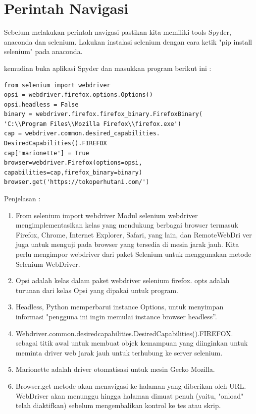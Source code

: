 


\section{Perintah Navigasi}
Sebelum melakukan perintah navigasi pastikan kita memiliki tools Spyder, anaconda dan selenium. Lakukan instalasi selenium dengan cara ketik "pip install selenium" pada anaconda.

kemudian buka aplikasi Spyder dan masukkan program berikut ini :
\begin{verbatim}
from selenium import webdriver
opsi = webdriver.firefox.options.Options()
opsi.headless = False
binary = webdriver.firefox.firefox_binary.FirefoxBinary(
'C:\\Program Files\\Mozilla Firefox\\firefox.exe')
cap = webdriver.common.desired_capabilities.
DesiredCapabilities().FIREFOX
cap['marionette'] = True
browser=webdriver.Firefox(options=opsi,
capabilities=cap,firefox_binary=binary)
browser.get('https://tokoperhutani.com/')
\end{verbatim}

Penjelasan : 
\begin{enumerate}
	\item From selenium import webdriver Modul selenium webdriver mengimplementasikan kelas yang mendukung berbagai browser termasuk Firefox, Chrome, Internet Explorer, Safari, yang lain, dan RemoteWebDri	ver juga untuk menguji pada browser yang tersedia di mesin jarak jauh. Kita perlu mengimpor webdriver dari paket Selenium untuk menggunakan metode Selenium WebDriver.
	\item Opsi adalah kelas dalam paket webdriver selenium firefox. opts adalah turunan dari kelas Opsi yang dipakai untuk program.
	\item Headless, Python memperbarui instance Options, untuk menyimpan informasi "pengguna ini ingin memulai instance browser headless”.
	\item Webdriver.common.desiredcapabilities.DesiredCapabilities().FIREFOX.   sebagai titik awal untuk membuat objek kemampuan yang diinginkan untuk meminta driver web jarak jauh untuk terhubung ke server selenium.  
	\item Marionette adalah driver otomatisasi untuk mesin Gecko Mozilla.
	\item Browser.get metode akan menavigasi ke halaman yang diberikan oleh URL. WebDriver akan menunggu hingga halaman dimuat penuh (yaitu, "onload" telah diaktifkan) sebelum mengembalikan kontrol ke tes atau skrip.
\end{enumerate}

